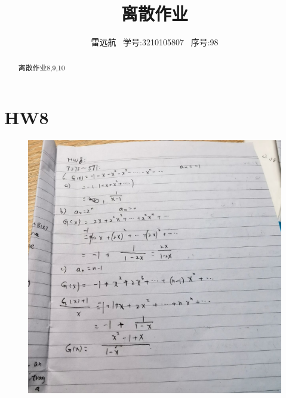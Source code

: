 \documentclass{article}
\title{离散作业}
\author{雷远航  \  学号:3210105807 \ 序号:98}
\begin{document}
\maketitle

\begin{abstract}
离散作业8,9,10

\end{abstract}

\section*{HW8}
    \begin{figure}[H]
    \centering
    \includegraphics[width=1\textwidth]{IMG_20221205_183619.jpg}
    \caption{\label{Lab9}}
    \end{figure}
\end{document}

